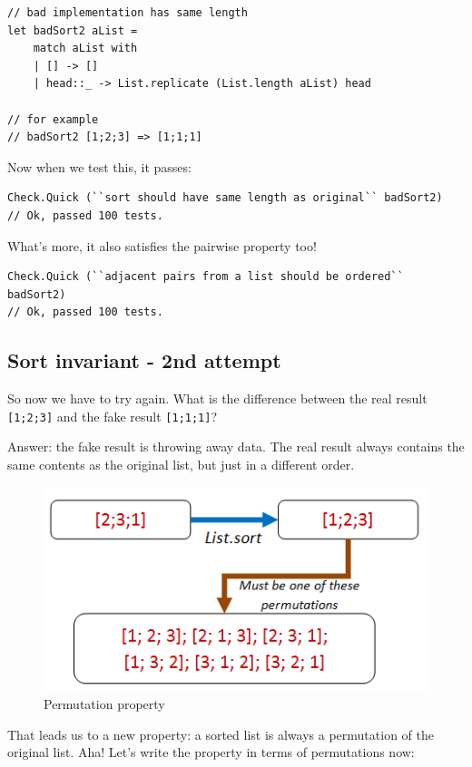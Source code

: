 \begin{verbatim}
// bad implementation has same length
let badSort2 aList = 
	match aList with 
	| [] -> []
	| head::_ -> List.replicate (List.length aList) head 

// for example 
// badSort2 [1;2;3] => [1;1;1]
\end{verbatim}
Now when we test this, it passes:

\begin{verbatim}
Check.Quick (``sort should have same length as original`` badSort2)
// Ok, passed 100 tests.
\end{verbatim}
What's more, it also satisfies the pairwise property too!

\begin{verbatim}
Check.Quick (``adjacent pairs from a list should be ordered`` badSort2)
// Ok, passed 100 tests.
\end{verbatim}


\subsection{Sort invariant - 2nd
attempt}
\label{sort-invariant---2nd-attempt}

So now we have to try again. What is the difference between the real
result \texttt{{[}1;2;3{]}} and the fake result \texttt{{[}1;1;1{]}}?

Answer: the fake result is throwing away data. The real result always
contains the same contents as the original list, but just in a different
order.

\begin{figure}[htbp]
\centering
\includegraphics{pics/property_list_sort_permutation.png}
\caption{Permutation property}
\end{figure}

That leads us to a new property: a sorted list is always a permutation
of the original list. Aha! Let's write the property in terms of
permutations now:

